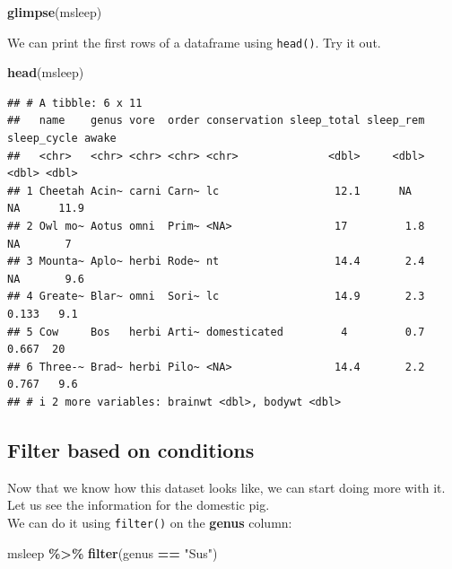 \documentclass[
]{book}
\newenvironment{Shaded}{\begin{snugshade}}{\end{snugshade}}
\newcommand{\FunctionTok}[1]{\textcolor[rgb]{0.13,0.29,0.53}{\textbf{#1}}}
\newcommand{\NormalTok}[1]{#1}
\newcommand{\SpecialCharTok}[1]{\textcolor[rgb]{0.81,0.36,0.00}{\textbf{#1}}}
\newcommand{\StringTok}[1]{\textcolor[rgb]{0.31,0.60,0.02}{#1}}
\begin{document}
\begin{Shaded}
\begin{Highlighting}[]
\FunctionTok{glimpse}\NormalTok{(msleep)}
\end{Highlighting}
\end{Shaded}

We can print the first rows of a dataframe using \texttt{head()}.
Try it out.

\begin{Shaded}
\begin{Highlighting}[]
\FunctionTok{head}\NormalTok{(msleep)}
\end{Highlighting}
\end{Shaded}

\begin{verbatim}
## # A tibble: 6 x 11
##   name    genus vore  order conservation sleep_total sleep_rem sleep_cycle awake
##   <chr>   <chr> <chr> <chr> <chr>              <dbl>     <dbl>       <dbl> <dbl>
## 1 Cheetah Acin~ carni Carn~ lc                  12.1      NA        NA      11.9
## 2 Owl mo~ Aotus omni  Prim~ <NA>                17         1.8      NA       7  
## 3 Mounta~ Aplo~ herbi Rode~ nt                  14.4       2.4      NA       9.6
## 4 Greate~ Blar~ omni  Sori~ lc                  14.9       2.3       0.133   9.1
## 5 Cow     Bos   herbi Arti~ domesticated         4         0.7       0.667  20  
## 6 Three-~ Brad~ herbi Pilo~ <NA>                14.4       2.2       0.767   9.6
## # i 2 more variables: brainwt <dbl>, bodywt <dbl>
\end{verbatim}

\hypertarget{filter-based-on-conditions}{%
\subsection*{Filter based on conditions}\label{filter-based-on-conditions}}

Now that we know how this dataset looks like, we can start doing more with it.
Let us see the information for the domestic pig.\\
We can do it using \texttt{filter()} on the \textbf{genus} column:

\begin{Shaded}
\begin{Highlighting}[]
\NormalTok{msleep }\SpecialCharTok{\%\textgreater{}\%}
  \FunctionTok{filter}\NormalTok{(genus }\SpecialCharTok{==} \StringTok{"Sus"}\NormalTok{)}
\end{Highlighting}
\end{Shaded}
\end{document}
